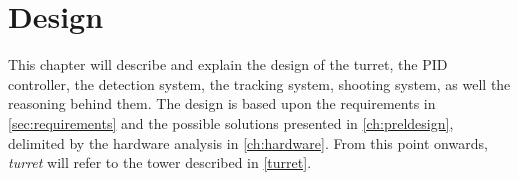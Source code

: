\chapter{Design}\label{ch:design}
This chapter will describe and explain the design of the turret, the PID controller, the detection system, the tracking system, shooting system, as well the reasoning behind them. The design is based upon the requirements in \cref{sec:requirements} and the possible solutions presented in \cref{ch:preldesign}, delimited by the hardware analysis in \cref{ch:hardware}. From this point onwards, \emph{turret} will refer to the tower described in \cref{turret}.













%
